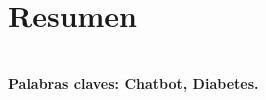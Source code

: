 \documentclass[12pt]{article}
\begin{document}
\section*{\centering Resumen}
 \\
\textbf{Palabras claves: Chatbot, Diabetes.}
%
\clearpage
{}
\renewcommand\contentsname{Índice}
\tableofcontents
\clearpage
{}
\setcounter{page}{1}

\clearpage
%
%
%
%

\clearpage
\end{document}
